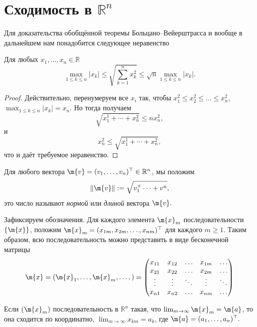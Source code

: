 \section{Сходимость в $\mathbb{R}^n$}



Для доказательства обобщённой теоремы Больцано--Вейерштрасса и вообще в дальнейшем нам понадобится следующее неравенство

\begin{lemma}\label{m<d<M}
Для любых $x_1,\ldots, x_n \in \mathbb{R}$ 
\[
\max_{1 \le k \le n} |x_k| \le \sqrt{\sum_{k=1}^n x_k^2} \le \sqrt{n} \max_{1\le k \le n} |x_k|.
\]
\end{lemma}
\begin{proof}
 
Действительно, перенумеруем все $x_i$ так, чтобы $x_1^2 \le x_2^2 \le \ldots \le x_n^2$, \ie $\max_{1 \le k \le n} |x_k| = x_n$. Но тогда получаем
\[
 \sqrt{x_1^1 + \cdots + x_n^2} \le n x_n^2, 
\]
и 
\[
 x_n^2 \le \sqrt{x_1^1 + \cdots + x_n^2},
\]
что и даёт требуемое неравенство.    
\end{proof}

Для любого вектора $\m{v} = (v_1,\ldots, v_n)^\top \in \mathbb{R}^n$, мы положим 
\[
 \| \m{v} \| : = \sqrt{ v_1^ + \cdots + v^n},
\]
это число называют \textit{нормой} или \textit{длиной} вектора $\m{v}.$




Зафиксируем обозначения. Для каждого элемента $\m{x}_m$ последовательности $\{\m{x}\}$, положим $\m{x}_m = (x_{1m}, x_{2m}, \ldots, x_{nm})^\top$ для каждого $m \ge 1$. Таким образом, всю последовательность можно представить в виде бесконечной матрицы
   \[
    \m{x} = (\m{x}_1,\ldots, \m{x}_m, \ldots,) = \begin{pmatrix}
        x_{11} & x_{12} & \ldots & x_{1m} & \ldots \\
        x_{21} & x_{22} & \ldots & x_{2m} & \ldots \\
        \vdots & \vdots & \ddots & \vdots & \ddots \\
        x_{n1} & x_{n2} & \ldots & x_{nm} & \ldots
    \end{pmatrix}
   \]

\begin{lemma}
    Если $(\m{x}_m)$ последовательность в $\mathbb{R}^n$ такая, что $\lim_{m \to \infty}\m{x}_m = \m{a}$, то она сходится по координатно, \ie $\lim_{m\to \infty}x_{km} = a_k$, где $\m{a} = (a_1, \ldots, a_n)^\top.$
\end{lemma}

